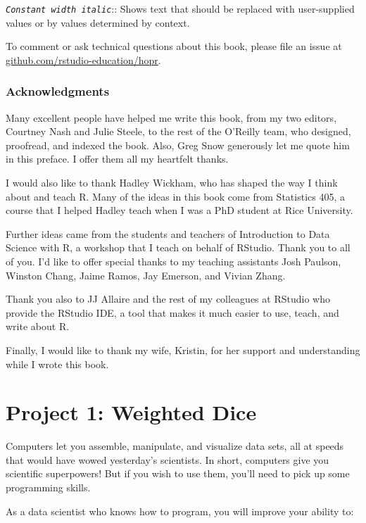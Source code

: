 \documentclass[
  letterpaper,
  DIV=11,
  numbers=noendperiod]{scrbook}
\begin{document}
\emph{\texttt{Constant\ width\ italic}}:: Shows text that should be
replaced with user-supplied values or by values determined by context.

To comment or ask technical questions about this book, please file an
issue at
\href{https://github.com/rstudio-education/hopr}{github.com/rstudio-education/hopr}.

\section*{Acknowledgments}\label{acknowledgments}


Many excellent people have helped me write this book, from my two
editors, Courtney Nash and Julie Steele, to the rest of the O'Reilly
team, who designed, proofread, and indexed the book. Also, Greg Snow
generously let me quote him in this preface. I offer them all my
heartfelt thanks.

I would also like to thank Hadley Wickham, who has shaped the way I
think about and teach R. Many of the ideas in this book come from
Statistics 405, a course that I helped Hadley teach when I was a PhD
student at Rice University.

Further ideas came from the students and teachers of Introduction to
Data Science with R, a workshop that I teach on behalf of RStudio. Thank
you to all of you. I'd like to offer special thanks to my teaching
assistants Josh Paulson, Winston Chang, Jaime Ramos, Jay Emerson, and
Vivian Zhang.

Thank you also to JJ Allaire and the rest of my colleagues at RStudio
who provide the RStudio IDE, a tool that makes it much easier to use,
teach, and write about R.

Finally, I would like to thank my wife, Kristin, for her support and
understanding while I wrote this book.

\part{Project 1: Weighted Dice}

Computers let you assemble, manipulate, and visualize data sets, all at
speeds that would have wowed yesterday's scientists. In short, computers
give you scientific superpowers! But if you wish to use them, you'll
need to pick up some programming skills.

As a data scientist who knows how to program, you will improve your
ability to:
\end{document}
